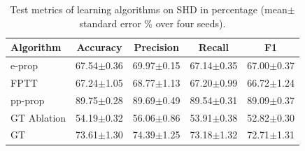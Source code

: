 \begin{table}[htbp]
\centering
\caption{Test metrics of learning algorithms on SHD in percentage (mean$\pm$standard error \% over four seeds).}
\label{tab:shd-metrics}
\begin{tabular}{lcccc}
\toprule
\textbf{Algorithm} & \textbf{Accuracy} & \textbf{Precision} & \textbf{Recall} & \textbf{F1} \\
\midrule
e-prop & 67.54$\pm$0.36 & 69.97$\pm$0.15 & 67.14$\pm$0.35 & 67.00$\pm$0.37 \\
FPTT & 67.24$\pm$1.05 & 68.77$\pm$1.13 & 67.20$\pm$0.99 & 66.72$\pm$1.24 \\
pp-prop & 89.75$\pm$0.28 & 89.69$\pm$0.49 & 89.54$\pm$0.31 & 89.09$\pm$0.37 \\
GT Ablation & 54.19$\pm$0.32 & 56.06$\pm$0.86 & 53.91$\pm$0.38 & 52.82$\pm$0.30 \\
GT & 73.61$\pm$1.30 & 74.39$\pm$1.25 & 73.18$\pm$1.32 & 72.71$\pm$1.31 \\
\bottomrule
\end{tabular}
\end{table}
